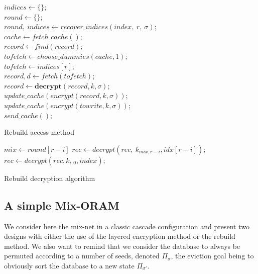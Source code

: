 \documentclass[USenglish,oneside,twocolumn]{article}
\begin{document}
\begin{algorithm}
\DontPrintSemicolon
{}
$indices \gets \{\}$;\\
$round\gets \{\}$;\\
{
$round,\ indices \gets recover\_indices(index,\ r,\ \sigma)$;\\
}
$cache \gets fetch\_cache()$;\\
{
$record \gets find(record)$;\\
$tofetch \gets choose\_dummies(cache, 1)$;\\
}
\Else
{
$tofetch \gets indices[r]$;\\
}
$record, d \gets fetch(tofetch)$;\\
$record \gets \textbf{decrypt}(record,k,\sigma)$;\\
{
$update\_cache(encrypt(record,k,\sigma))$;\\
}
\Else
{
$update\_cache(encrypt(towrite,k,\sigma))$;\\
}
$send\_cache()$;\\
\caption{Rebuild access method}
\label{alg:racc}
\end{algorithm}

\begin{algorithm}
\DontPrintSemicolon
{}
{
$mix \gets round[r-i]$
$rec \gets decrypt(rec,\ k_{mix,r-i}, idx[r-i] )$;\\
}
{
$rec \gets decrypt(rec, k_{i,0}, index )$;\\
}
\caption{Rebuild decryption algorithm}
\label{alg:rdec}
\end{algorithm}
%
\subsection{A simple Mix-ORAM}\label{SMO}
%
We consider here the mix-net in a classic cascade configuration and present two designs with either the use of the layered encryption method or the rebuild method. We also want to remind that we consider the database to always be permuted according to a number of seeds, denoted $\Pi_{\sigma}$, the eviction goal being to obviously sort the database to a new state $\Pi_{\sigma'}$.\\
\end{document}
